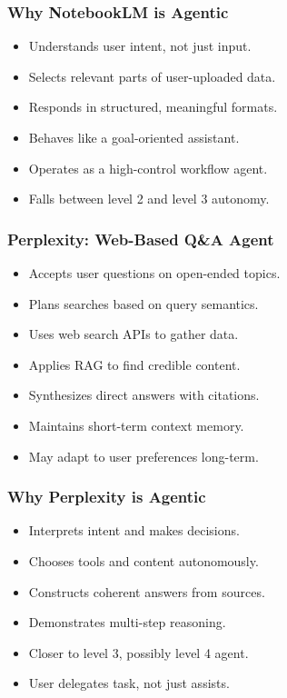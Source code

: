 \begin{frame}[fragile]\frametitle{Why NotebookLM is Agentic}
    \begin{itemize}
        \item Understands user intent, not just input.
        \item Selects relevant parts of user-uploaded data.
        \item Responds in structured, meaningful formats.
        \item Behaves like a goal-oriented assistant.
        \item Operates as a high-control workflow agent.
        \item Falls between level 2 and level 3 autonomy.
    \end{itemize}
\end{frame}

\begin{frame}[fragile]\frametitle{Perplexity: Web-Based Q\&A Agent}
    \begin{itemize}
        \item Accepts user questions on open-ended topics.
        \item Plans searches based on query semantics.
        \item Uses web search APIs to gather data.
        \item Applies RAG to find credible content.
        \item Synthesizes direct answers with citations.
        \item Maintains short-term context memory.
        \item May adapt to user preferences long-term.
    \end{itemize}
\end{frame}

\begin{frame}[fragile]\frametitle{Why Perplexity is Agentic}
    \begin{itemize}
        \item Interprets intent and makes decisions.
        \item Chooses tools and content autonomously.
        \item Constructs coherent answers from sources.
        \item Demonstrates multi-step reasoning.
        \item Closer to level 3, possibly level 4 agent.
        \item User delegates task, not just assists.
    \end{itemize}
\end{frame}

